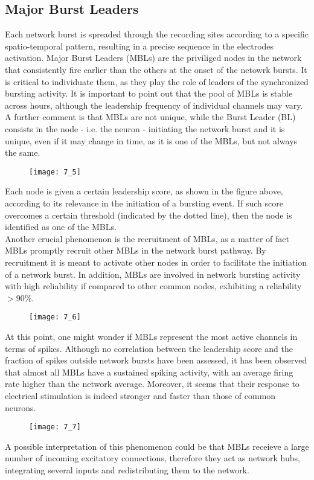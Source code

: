 \subsection{Major Burst Leaders}
Each network burst is spreaded through the recording sites according to a specific
spatio-temporal pattern, resulting in a precise sequence in the electrodes activation.
Major Burst Leaders (MBLs) are the priviliged nodes in the network that consistently
fire earlier than the others at the onset of the netowrk bursts. It is critical to
individuate them, as they play the role of leaders of the synchronized bursting
activity. It is important to point out that the pool of MBLs is stable across hours,
although the leadership frequency of individual channels may vary. A further comment
is that MBLs are not unique, while the Burst Leader (BL) consists in the node
- i.e. the neuron - initiating the network burst and it is unique, even if it may
change in time, as it is one of the MBLs, but not always the same.
\begin{figure}[H]
    \texttt{[image: 7\_5]}
    \centering
\end{figure}
Each node is given a certain leadership score, as shown in the figure above, according
to its relevance in the initiation of a bursting event. If such score overcomes a
certain threshold (indicated by the dotted line), then the node is identified as
one of the MBLs.\\
Another crucial phenomenon is the recruitment of MBLs, as a matter of fact MBLs
promptly recruit other MBLs in the network burst pathway. By recruitment it is meant
to activate other nodes in order to facilitate the initiation of a network burst.
In addition, MBLs are involved in network bursting activity with high reliability
if compared to other common nodes, exhibiting a reliability \(>90\%\).
\begin{figure}[H]
    \texttt{[image: 7\_6]}
    \centering
\end{figure}
At this point, one might wonder if MBLs represent the most active channels in terms
of spikes. Although no correlation between the leadership score and the fraction of
spikes outside network bursts have been assessed, it has been observed that almost
all MBLs have a sustained spiking activity, with an average firing rate higher than
the network average. Moreover, it seems that their response to electrical stimulation
is indeed stronger and faster than those of common neurons.
\begin{figure}[H]
    \texttt{[image: 7\_7]}
    \centering
\end{figure}
A possible interpretation of this phenomenon could be that MBLs receieve a large number
of incoming excitatory connections, therefore they act as network hubs, integrating
several inputs and redistributing them to the network.